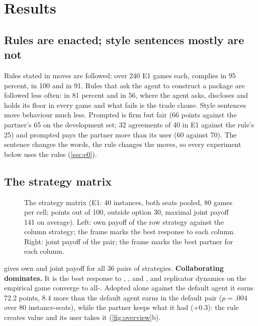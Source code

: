 \section{Results}
\label{sec:results}

\subsection{Rules are enacted; style sentences mostly are not}
\label{sec:r-enact}
Rules stated in moves are followed: over 240 E1 games each, \competing{} complies in 95 percent, \avoiding{} in 100 and \accommodating{} in 91. Rules that ask the agent to construct a package are followed less often: \compromising{} in 81 percent and \collaborating{} in 56, where the agent asks, discloses and holds its floor in every game and what fails is the trade clause. Style sentences move behaviour much less. Prompted \competing{} is firm but fair (66 points against the partner's 65 on the development set; 32 agreements of 40 in E1 against the rule's 25) and prompted \collaborating{} pays the partner more than its user (60 against 70). The sentence changes the words, the rule changes the moves, so every experiment below uses the rules (\cref{sec:e0}).

\subsection{The strategy matrix}
\label{sec:r-matrix}

\begin{figure}[t]
\centering
\FigMatrix
\caption{The strategy matrix (E1: 40 instances, both seats pooled, 80 games per cell; points out of 100, outside option 30, maximal joint payoff 141 on average). Left: own payoff of the row strategy against the column strategy; the frame marks the best response to each column. Right: joint payoff of the pair; the frame marks the best partner for each column.}
\label{fig:matrix}
\end{figure}

 gives own and joint payoff for all 36 pairs of strategies. \textbf{Collaborating dominates.} It is the best response to \neutral, \competing, \collaborating{} and \avoiding, and replicator dynamics on the empirical game converge to all-\collaborating. Adopted alone against the default agent it earns 72.2 points, 8.4 more than the default agent earns in the default pair ($p = .004$ over 80 instance-seats), while the partner keeps what it had ($+0.3$): the rule creates value and its user takes it (\cref{fig:overview}b).

